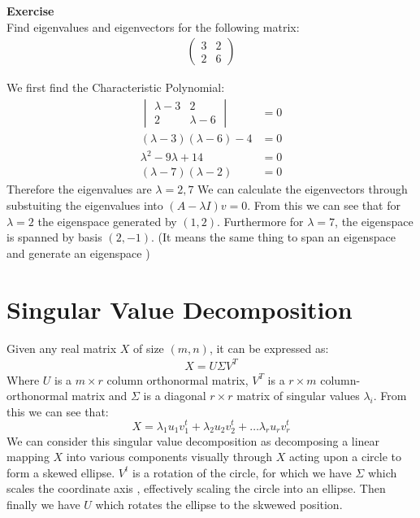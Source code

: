 \begin{cBox}
	\textbf{Exercise} \\
	Find eigenvalues and eigenvectors for the following matrix:
	\begin{align*}
		\begin{pmatrix}
		3 & 2 \\ 2 & 6
	\end{pmatrix}
	\end{align*}
	\begin{solution}
		We first find the Characteristic Polynomial:
			\begin{align*}
				\begin{vmatrix}
					\lambda - 3 & 2 \\
					2 & \lambda -6 
				\end{vmatrix} & = 0\\
				(\lambda-3)(\lambda-6) -4 & = 0\\
				\lambda^2 - 9\lambda + 14 & = 0\\
				(\lambda -7)(\lambda-2) & = 0
			\end{align*}
			Therefore the eigenvalues are $\lambda = 2, 7$ We can calculate the eigenvectors through substuiting the eigenvalues into $(A - \lambda I)v = 0$. From this we can see that for $\lambda = 2$ the eigenspace generated by $(1,2)$. Furthermore for $\lambda = 7$, the eigenspace is spanned by basis $(2,-1)$. (It means the same thing to span an eigenspace and generate an eigenspace )
	\end{solution}
\end{cBox}

\section{Singular Value Decomposition}
Given any real matrix $X$ of size $(m,n)$, it can be expressed as:
\begin{align*}
	X = U \Sigma V^T
\end{align*}
Where $U$ is a $m\times r$ column orthonormal matrix, $V^T$ is a $r \times m$ column-orthonormal matrix and $\Sigma$ is a diagonal $r\times r$ matrix of singular values $\lambda_i$. From this we can see that:
\begin{equation}
X = \lambda_1 u_1 v^t_1 + \lambda_2 u_2 v^t_2 + \dots \lambda_r u_r v^t_r
\end{equation}
We can consider this singular value decomposition as decomposing a linear mapping $X$ into various components visually through $X$ acting upon a circle to form a skewed ellipse. $V^t$ is a rotation of the circle, for which we have $\Sigma$ which scales the coordinate axis , effectively scaling the circle into an ellipse. Then finally we have $U$ which rotates the ellipse to the skwewed position. 

